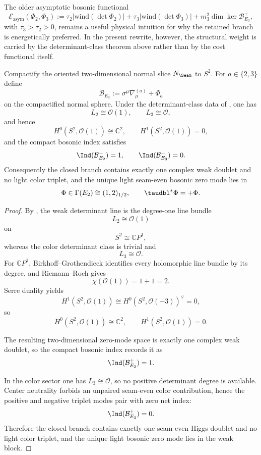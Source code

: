 \begin{remark}
The older asymptotic bosonic functional
\[
\mathcal E_{\mathrm{asym}}(\Phi_2,\Phi_3)
:=
\tau_2\bigl|\mathrm{wind}(\det\Phi_2)\bigr|
+\tau_3\bigl|\mathrm{wind}(\det\Phi_3)\bigr|
+m_3^2\dim\ker\mathcal B_{E_3}^+,
\]
with $\tau_3>\tau_2>0$, remains a useful physical intuition for why the retained branch is energetically preferred. In the present rewrite, however, the structural weight is carried by the determinant-class theorem above rather than by the cost functional itself.
\end{remark}

\begin{theorem}
\label{thm:callias-higgs-selection}
\label{thm:compact-higgs-unique}
\label{thm:compact-determinant-higgs-index}
Compactify the oriented two-dimensional normal slice $N_\Seam$ to $S^2$. For $a\in\{2,3\}$
define
\[
\mathcal B_{E_a}:=\sigma^\mu\nabla^{(a)}_\mu+\Phi_a
\]
on the compactified normal sphere. Under the determinant-class data of
, one has
\[
L_2\cong\mathcal O(1),
\qquad
L_3\cong\mathcal O,
\]
and hence
\[
H^0(S^2,\mathcal O(1))\cong\mathbb C^2,
\qquad
H^1(S^2,\mathcal O(1))=0,
\]
and the compact bosonic index satisfies
\[
\Ind(\mathcal B_{E_2}^+)=1,
\qquad
\Ind(\mathcal B_{E_3}^+)=0.
\]
Consequently the closed branch contains exactly one complex weak doublet and no light color triplet,
and the unique light seam-even bosonic zero mode lies in
\[
\Phi\in\Gamma(E_2)\cong (1,2)_{1/2},
\qquad
\taudbl^{\ast}\Phi=+\Phi.
\]
\end{theorem}

\begin{proof}
By , the weak determinant line is the degree-one line
bundle
\[
L_2\cong\mathcal O(1)
\]
on
\[
S^2\cong\mathbb CP^1,
\]
whereas the color determinant class is trivial and
\[
L_3\cong\mathcal O.
\]
For $\mathbb CP^1$, Birkhoff--Grothendieck identifies every holomorphic line bundle by its degree,
and Riemann--Roch gives
\[
\chi(\mathcal O(1))=1+1=2.
\]
Serre duality yields
\[
H^1(S^2,\mathcal O(1))
\cong
H^0(S^2,\mathcal O(-3))^\vee
=0,
\]
so
\[
H^0(S^2,\mathcal O(1))\cong\mathbb C^2,
\qquad
H^1(S^2,\mathcal O(1))=0.
\]

The resulting two-dimensional zero-mode space is exactly one complex weak doublet, so the compact
bosonic index records it as
\[
\Ind(\mathcal B_{E_2}^+)=1.
\]

In the color sector one has $L_3\cong\mathcal O$, so no positive determinant degree is available.
Center neutrality forbids an unpaired seam-even color contribution, hence the positive and negative
triplet modes pair with zero net index:
\[
\Ind(\mathcal B_{E_3}^+)=0.
\]
Therefore the closed branch contains exactly one seam-even Higgs doublet and no light color
triplet, and the unique light bosonic zero mode lies in the weak block.
\end{proof}


